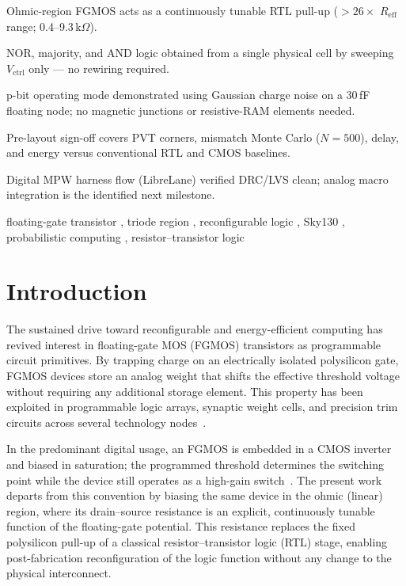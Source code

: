 \documentclass[a4paper,fleqn]{cas-sc}
\newcommand{\Vctrl}{V_{\mathrm{ctrl}}}
\newcommand{\Reff}{R_{\mathrm{eff}}}
\begin{document}
\begin{highlights}
\item Ohmic-region FGMOS acts as a continuously tunable RTL pull-up
      ($>$$26\times$ $\Reff$ range; 0.4--9.3\,k$\Omega$).
\item NOR, majority, and AND logic obtained from a single physical cell
      by sweeping $\Vctrl$ only --- no rewiring required.
\item p-bit operating mode demonstrated using Gaussian charge noise on a
      30\,fF floating node; no magnetic junctions or resistive-RAM elements needed.
\item Pre-layout sign-off covers PVT corners, mismatch Monte Carlo
      ($N=500$), delay, and energy versus conventional RTL and CMOS baselines.
\item Digital MPW harness flow (LibreLane) verified DRC/LVS clean;
      analog macro integration is the identified next milestone.
\end{highlights}

\begin{keywords}
floating-gate transistor \sep
triode region \sep
reconfigurable logic \sep
Sky130 \sep
probabilistic computing \sep
resistor--transistor logic
\end{keywords}

\maketitle

\section{Introduction}
\label{sec:intro}

The sustained drive toward reconfigurable and energy-efficient computing has revived
interest in floating-gate MOS (FGMOS) transistors as programmable circuit primitives.
By trapping charge on an electrically isolated polysilicon gate, FGMOS devices store an
analog weight that shifts the effective threshold voltage without requiring any
additional storage element. This property has been exploited in programmable logic
arrays, synaptic weight cells, and precision trim circuits across several technology
nodes~\cite{Shibata2003,Wisland2003}.

In the predominant digital usage, an FGMOS is embedded in a CMOS inverter and biased
in saturation; the programmed threshold determines the switching point while the device
still operates as a high-gain switch~\cite{Gray2009}. The present work departs from
this convention by biasing the same device in the ohmic (linear) region, where its
drain--source resistance is an explicit, continuously tunable function of the
floating-gate potential. This resistance replaces the fixed polysilicon pull-up of a
classical resistor--transistor logic (RTL) stage, enabling post-fabrication
reconfiguration of the logic function without any change to the physical interconnect.
\end{document}
